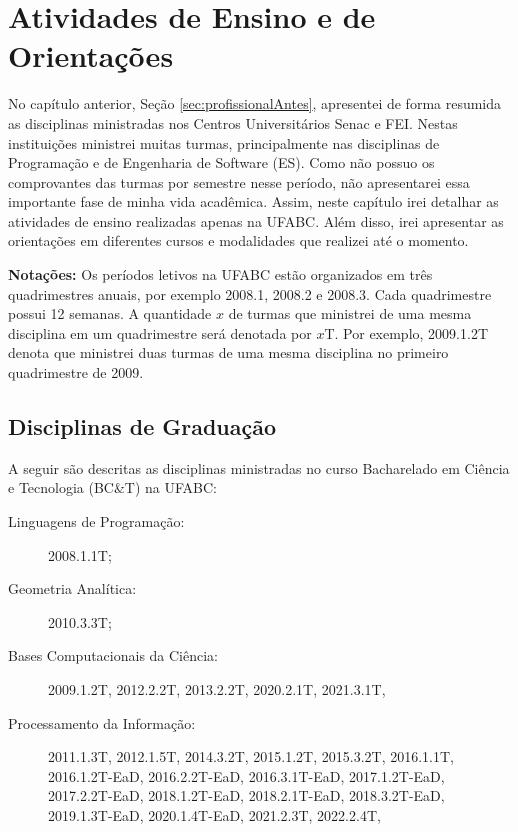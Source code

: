 

\chapter{Atividades de Ensino e de Orientações}\label{cap:ensino}

No capítulo anterior, Seção \ref{sec:profissionalAntes}, apresentei de forma resumida as disciplinas ministradas nos Centros Universitários Senac e FEI. Nestas instituições ministrei muitas turmas, principalmente nas disciplinas de Programação e de Engenharia de Software (ES). Como não possuo os comprovantes das turmas por semestre nesse período, não apresentarei essa importante fase de minha vida acadêmica. Assim, neste capítulo irei detalhar as atividades de ensino realizadas apenas na UFABC. Além disso, irei apresentar as orientações em diferentes cursos e modalidades que realizei até o momento.

\noindent
\textbf{Notações:} Os períodos letivos na UFABC estão organizados em três quadrimestres anuais, por exemplo 2008.1, 2008.2 e 2008.3. Cada quadrimestre possui 12 semanas. A quantidade $x$ de turmas que ministrei de uma mesma disciplina em um quadrimestre será denotada por $x$T. Por exemplo, 2009.1.2T denota que ministrei duas turmas de uma mesma disciplina no primeiro quadrimestre de 2009.

\section{Disciplinas de Graduação}

A seguir são descritas as disciplinas ministradas no curso Bacharelado em Ciência e Tecnologia (BC\&T) na UFABC:
\begin{description}
    \item [Linguagens de Programação:] 2008.1.1T;
    \item [Geometria Analítica:] 2010.3.3T;
    \item [Bases Computacionais da Ciência:] 2009.1.2T, 2012.2.2T, 2013.2.2T, 2020.2.1T, 2021.3.1T, 
    \item [Processamento da Informação:] 2011.1.3T, 2012.1.5T, 2014.3.2T, 2015.1.2T, 2015.3.2T, 2016.1.1T, 2016.1.2T-EaD, 2016.2.2T-EaD, 2016.3.1T-EaD, 2017.1.2T-EaD, 2017.2.2T-EaD, 2018.1.2T-EaD, 2018.2.1T-EaD, 2018.3.2T-EaD, 2019.1.3T-EaD, 2020.1.4T-EaD, 2021.2.3T, 2022.2.4T, 
\end{description}

